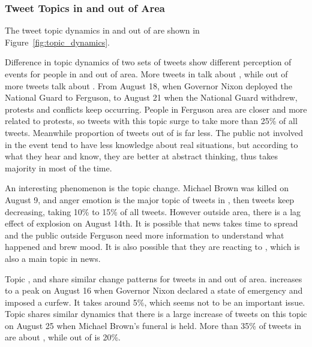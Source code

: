 \subsubsection{Tweet Topics in and out of \stlouis Area}
The tweet topic dynamics in and out of \stlouis are shown in Figure~\ref{fig:topic_dynamics}.

Difference in topic dynamics of two sets of tweets show different perception of events for people in and out of \stlouis area. More tweets in \stlouis talk about \protest, while out of \stlouis more tweets talk about \racism. From August 18, when Governor Nixon deployed the National Guard to Ferguson, to August 21 when the National Guard withdrew, protests and conflicts keep occurring. People in Ferguson area are closer and more related to protests, so tweets with this topic surge to take more than 25\% of all tweets. Meanwhile proportion of \protest tweets out of \stlouis is far less. The public not involved in the event tend to have less knowledge about real situations, but according to what they hear and know, they are better at abstract thinking, thus \racism takes majority in most of the time.

An interesting phenomenon is the \emotion topic change. Michael Brown was killed on August 9, and anger emotion is the major topic of tweets in \stlouis, then \emotion tweets keep decreasing, taking 10\% to 15\% of all tweets. However outside \stlouis area, there is a lag effect of \emotion explosion on August 14th. It is possible that news takes time to spread and the public outside Ferguson need more information to understand what happened and brew mood. It is also possible that they are reacting to \obamatalk, which is also a main topic in news.

Topic \curfew, \newsreport and \michaelbrown share similar change patterns for tweets in and out of \stlouis area. \curfew increases to a peak on August 16 when Governor Nixon declared a state of emergency and imposed a curfew. It takes around 5\%, which seems not to be an important issue. Topic \pray shares similar dynamics that there is a large increase of tweets on this topic on August 25 when Michael Brown's funeral is held. More than 35\% of tweets in \stlouis are about \pray, while out of \stlouis is 20\%.

